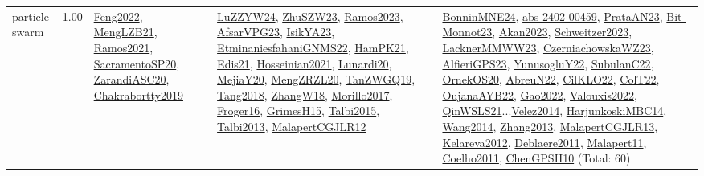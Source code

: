 {\begin{longtable}{p{3cm}r>{\raggedright\arraybackslash}p{6cm}>{\raggedright\arraybackslash}p{6cm}>{\raggedright\arraybackslash}p{8cm}}
\index{particle swarm}\index{Algorithms!particle swarm}particle swarm &  1.00 & \hyperref[detail:Feng2022]{Feng2022}, \hyperref[detail:MengLZB21]{MengLZB21}, \hyperref[detail:Ramos2021]{Ramos2021}, \hyperref[detail:SacramentoSP20]{SacramentoSP20}, \hyperref[detail:ZarandiASC20]{ZarandiASC20}, \hyperref[detail:Chakrabortty2019]{Chakrabortty2019} & \hyperref[detail:LuZZYW24]{LuZZYW24}, \hyperref[detail:ZhuSZW23]{ZhuSZW23}, \hyperref[detail:Ramos2023]{Ramos2023}, \hyperref[detail:AfsarVPG23]{AfsarVPG23}, \hyperref[detail:IsikYA23]{IsikYA23}, \hyperref[detail:EtminaniesfahaniGNMS22]{EtminaniesfahaniGNMS22}, \hyperref[detail:HamPK21]{HamPK21}, \hyperref[detail:Edis21]{Edis21}, \hyperref[detail:Hosseinian2021]{Hosseinian2021}, \hyperref[detail:Lunardi20]{Lunardi20}, \hyperref[detail:MejiaY20]{MejiaY20}, \hyperref[detail:MengZRZL20]{MengZRZL20}, \hyperref[detail:TanZWGQ19]{TanZWGQ19}, \hyperref[detail:Tang2018]{Tang2018}, \hyperref[detail:ZhangW18]{ZhangW18}, \hyperref[detail:Morillo2017]{Morillo2017}, \hyperref[detail:Froger16]{Froger16}, \hyperref[detail:GrimesH15]{GrimesH15}, \hyperref[detail:Talbi2015]{Talbi2015}, \hyperref[detail:Talbi2013]{Talbi2013}, \hyperref[detail:MalapertCGJLR12]{MalapertCGJLR12} & \hyperref[detail:BonninMNE24]{BonninMNE24}, \hyperref[detail:abs-2402-00459]{abs-2402-00459}, \hyperref[detail:PrataAN23]{PrataAN23}, \hyperref[detail:Bit-Monnot23]{Bit-Monnot23}, \hyperref[detail:Akan2023]{Akan2023}, \hyperref[detail:Schweitzer2023]{Schweitzer2023}, \hyperref[detail:LacknerMMWW23]{LacknerMMWW23}, \hyperref[detail:CzerniachowskaWZ23]{CzerniachowskaWZ23}, \hyperref[detail:AlfieriGPS23]{AlfieriGPS23}, \hyperref[detail:YunusogluY22]{YunusogluY22}, \hyperref[detail:SubulanC22]{SubulanC22}, \hyperref[detail:OrnekOS20]{OrnekOS20}, \hyperref[detail:AbreuN22]{AbreuN22}, \hyperref[detail:CilKLO22]{CilKLO22}, \hyperref[detail:ColT22]{ColT22}, \hyperref[detail:OujanaAYB22]{OujanaAYB22}, \hyperref[detail:Gao2022]{Gao2022}, \hyperref[detail:Valouxis2022]{Valouxis2022}, \hyperref[detail:QinWSLS21]{QinWSLS21}...\hyperref[detail:Velez2014]{Velez2014}, \hyperref[detail:HarjunkoskiMBC14]{HarjunkoskiMBC14}, \hyperref[detail:Wang2014]{Wang2014}, \hyperref[detail:Zhang2013]{Zhang2013}, \hyperref[detail:MalapertCGJLR13]{MalapertCGJLR13}, \hyperref[detail:Kelareva2012]{Kelareva2012}, \hyperref[detail:Deblaere2011]{Deblaere2011}, \hyperref[detail:Malapert11]{Malapert11}, \hyperref[detail:Coelho2011]{Coelho2011}, \hyperref[detail:ChenGPSH10]{ChenGPSH10} (Total: 60)\\

\end{longtable}}
